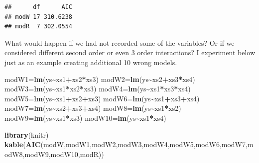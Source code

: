 \documentclass[
]{book}
\newenvironment{Shaded}{\begin{snugshade}}{\end{snugshade}}
\newcommand{\FunctionTok}[1]{\textcolor[rgb]{0.13,0.29,0.53}{\textbf{#1}}}
\newcommand{\NormalTok}[1]{#1}
\newcommand{\OtherTok}[1]{\textcolor[rgb]{0.56,0.35,0.01}{#1}}
\newcommand{\SpecialCharTok}[1]{\textcolor[rgb]{0.81,0.36,0.00}{\textbf{#1}}}
\begin{document}
\begin{verbatim}
##      df      AIC
## modW 17 310.6238
## modR  7 302.0554
\end{verbatim}

What would happen if we had not recorded some of the variables? Or if we considered different second order or even 3 order interactions? I experiment below just as an example creating additional 10 wrong models.

\begin{Shaded}
\begin{Highlighting}[]
\NormalTok{modW1}\OtherTok{=}\FunctionTok{lm}\NormalTok{(ys}\SpecialCharTok{\textasciitilde{}}\NormalTok{xs1}\SpecialCharTok{+}\NormalTok{xs2}\SpecialCharTok{*}\NormalTok{xs3)}
\NormalTok{modW2}\OtherTok{=}\FunctionTok{lm}\NormalTok{(ys}\SpecialCharTok{\textasciitilde{}}\NormalTok{xs2}\SpecialCharTok{+}\NormalTok{xs3}\SpecialCharTok{*}\NormalTok{xs4)}
\NormalTok{modW3}\OtherTok{=}\FunctionTok{lm}\NormalTok{(ys}\SpecialCharTok{\textasciitilde{}}\NormalTok{xs1}\SpecialCharTok{*}\NormalTok{xs2}\SpecialCharTok{*}\NormalTok{xs3)}
\NormalTok{modW4}\OtherTok{=}\FunctionTok{lm}\NormalTok{(ys}\SpecialCharTok{\textasciitilde{}}\NormalTok{xs1}\SpecialCharTok{*}\NormalTok{xs3}\SpecialCharTok{*}\NormalTok{xs4)}
\NormalTok{modW5}\OtherTok{=}\FunctionTok{lm}\NormalTok{(ys}\SpecialCharTok{\textasciitilde{}}\NormalTok{xs1}\SpecialCharTok{+}\NormalTok{xs2}\SpecialCharTok{+}\NormalTok{xs3)}
\NormalTok{modW6}\OtherTok{=}\FunctionTok{lm}\NormalTok{(ys}\SpecialCharTok{\textasciitilde{}}\NormalTok{xs1}\SpecialCharTok{+}\NormalTok{xs3}\SpecialCharTok{+}\NormalTok{xs4)}
\NormalTok{modW7}\OtherTok{=}\FunctionTok{lm}\NormalTok{(ys}\SpecialCharTok{\textasciitilde{}}\NormalTok{xs2}\SpecialCharTok{+}\NormalTok{xs3}\SpecialCharTok{+}\NormalTok{xs4)}
\NormalTok{modW8}\OtherTok{=}\FunctionTok{lm}\NormalTok{(ys}\SpecialCharTok{\textasciitilde{}}\NormalTok{xs1}\SpecialCharTok{*}\NormalTok{xs2)}
\NormalTok{modW9}\OtherTok{=}\FunctionTok{lm}\NormalTok{(ys}\SpecialCharTok{\textasciitilde{}}\NormalTok{xs1}\SpecialCharTok{*}\NormalTok{xs3)}
\NormalTok{modW10}\OtherTok{=}\FunctionTok{lm}\NormalTok{(ys}\SpecialCharTok{\textasciitilde{}}\NormalTok{xs1}\SpecialCharTok{*}\NormalTok{xs4)}
\end{Highlighting}
\end{Shaded}

\begin{Shaded}
\begin{Highlighting}[]
\FunctionTok{library}\NormalTok{(knitr)}
\FunctionTok{kable}\NormalTok{(}\FunctionTok{AIC}\NormalTok{(modW,modW1,modW2,modW3,modW4,modW5,modW6,modW7,modW8,modW9,modW10,modR))}
\end{Highlighting}
\end{Shaded}
\end{document}
